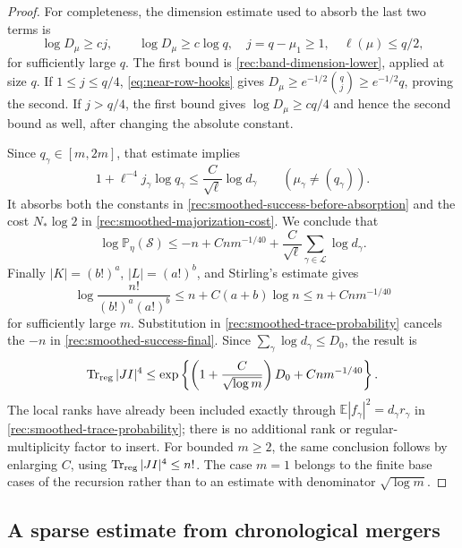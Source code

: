 \begin{proof}
For completeness, the dimension estimate used to absorb the last
two terms is
\begin{equation}\label{rec:smoothed-dimension-absorption}
 \log D_\mu\ge c j,
 \qquad \log D_\mu\ge c\log q,
 \quad j=q-\mu_1\ge1,\quad \ell(\mu)\le q/2,
\end{equation}
for sufficiently large $q$.
The first bound is \eqref{rec:band-dimension-lower}, applied at
size $q$. If $1\le j\le q/4$, \eqref{eq:near-row-hooks} gives
$D_\mu\ge e^{-1/2}\binom qj\ge e^{-1/2}q$, proving the second.
If $j>q/4$, the first bound gives $\log D_\mu\ge cq/4$ and
hence the second bound as well, after changing the absolute constant.

Since $q_\gamma\in[m,2m]$, that estimate implies
\[
 1+\ell^{-4}j_\gamma\log q_\gamma
            \le \frac{C}{\sqrt\ell}\log d_\gamma
               \qquad(\mu_\gamma\ne(q_\gamma)).
\]
It absorbs both the constants in
\eqref{rec:smoothed-success-before-absorption} and the cost
$N_*\log2$ in \eqref{rec:smoothed-majorization-cost}.
We conclude that
\begin{equation}\label{rec:smoothed-success-final}
 \log\mathbb P_\eta(\mathcal S)
 \le-n+Cn m^{-1/40}
                 +\frac{C}{\sqrt\ell}
                        \sum_{\gamma\in\mathcal L}\log d_\gamma.
\end{equation}
Finally $|K|=(b!)^a$, $|L|=(a!)^b$, and Stirling's estimate gives
\[
 \log\frac{n!}{(b!)^a(a!)^b}
 \le n+C(a+b)\log n
 \le n+Cn m^{-1/40}
\]
for sufficiently large $m$. Substitution in
\eqref{rec:smoothed-trace-probability} cancels the $-n$ in
\eqref{rec:smoothed-success-final}. Since
$\sum_\gamma\log d_\gamma\le D_0$, the result is
\[
 \operatorname{Tr}_{\rm reg}|JI|^4
 \le\exp\left\{\left(1+\frac{C}{\sqrt{\log m}}\right)D_0
                         +Cn m^{-1/40}\right\}.
\]
The local ranks have already been included exactly through
$\mathbb E|f_\gamma|^2=d_\gamma r_\gamma$ in
\eqref{rec:smoothed-trace-probability}; there is no additional
rank or regular-multiplicity factor to insert. For bounded
$m\ge2$, the same conclusion follows by enlarging $C$, using
$\operatorname{Tr}_{\rm reg}|JI|^4\le n!$. The case $m=1$
belongs to the finite base cases of the recursion rather than
to an estimate with denominator $\sqrt{\log m}$.
\end{proof}

\subsection{A sparse estimate from chronological mergers}

